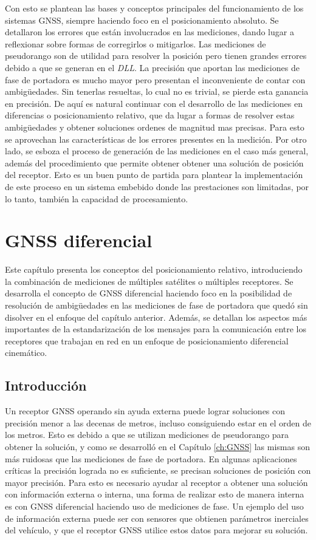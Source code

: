 \documentclass[a4paper,12pt,oneside,onecolumn,final,openright]{book}%
\begin{document}
	Con esto se plantean las bases y conceptos principales del funcionamiento de los sistemas GNSS, siempre haciendo foco en el posicionamiento absoluto. Se detallaron los errores que están involucrados en las mediciones, dando lugar a reflexionar sobre formas de corregirlos o mitigarlos. Las mediciones de pseudorango son de utilidad para resolver la posición pero tienen grandes errores debido a que se generan en el \textit{DLL}. La precisión que aportan las mediciones de fase de portadora es mucho mayor pero presentan el inconveniente de contar con ambigüedades. Sin tenerlas resueltas, lo cual no es trivial, se pierde esta ganancia en precisión. De aquí es natural continuar con el desarrollo de las mediciones en diferencias o posicionamiento relativo, que da lugar a formas de resolver estas ambigüedades y obtener soluciones ordenes de magnitud mas precisas. Para esto se aprovechan las características de los errores presentes en la medición. Por otro lado, se esboza el proceso de generación de las mediciones en el caso más general, además del procedimiento que permite obtener obtener una solución de posición del receptor. Esto es un buen punto de partida para plantear la implementación de este proceso en un sistema embebido donde las prestaciones son limitadas, por lo tanto, también la capacidad de procesamiento.

\chapter{GNSS diferencial}\label{CH:DGNSS}
	Este capítulo presenta los conceptos del posicionamiento relativo, introduciendo la combinación de mediciones de múltiples satélites o múltiples receptores. Se desarrolla el concepto de GNSS diferencial haciendo foco en la posibilidad de resolución de ambigüedades en las mediciones de fase de portadora que quedó sin disolver en el enfoque del capítulo anterior. Además, se detallan los aspectos más importantes de la estandarización de los mensajes para la comunicación entre los receptores que trabajan en red en un enfoque de posicionamiento diferencial cinemático.
\section{Introducción}
	Un receptor GNSS operando sin ayuda externa puede lograr soluciones con precisión menor a las decenas de metros, incluso consiguiendo estar en el orden de los metros. Esto es debido a que se utilizan mediciones de pseudorango para obtener la solución, y como se desarrolló en el Capítulo \ref{ch:GNSS} las mismas son más ruidosas que las mediciones de fase de portadora. En algunas aplicaciones críticas la precisión lograda no es suficiente, se precisan soluciones de posición con mayor precisión.  Para esto es necesario ayudar al receptor a obtener una solución con información externa o interna, una forma de realizar esto de manera interna es con GNSS diferencial haciendo uso de mediciones de fase. Un ejemplo del uso de información externa puede ser con sensores que obtienen parámetros inerciales del vehículo, y que el receptor GNSS utilice estos datos para mejorar su solución.
	
\end{document}

